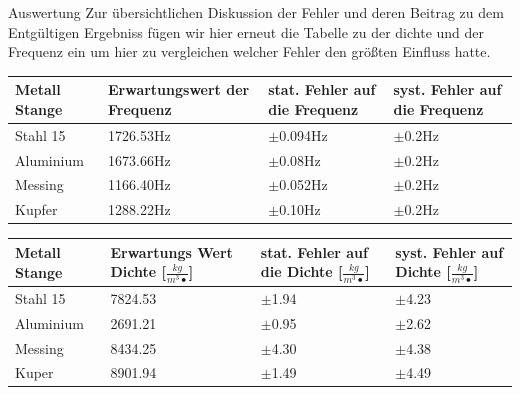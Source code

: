 \documentclass[twoside]{protokoll}
\begin{document}
\begin{aufgabe}{Auswertung}
Zur übersichtlichen Diskussion der Fehler und deren Beitrag zu dem Entgültigen Ergebniss fügen wir hier erneut die Tabelle zu der dichte und der Frequenz ein um hier zu vergleichen welcher Fehler den größten Einfluss hatte. 

 \begin{table}[H]
        \centering
        \begin{tabularx}{1\textwidth}{X X X X} %
            \toprule
            \textbf{Metall Stange} & \textbf{Erwartungswert der Frequenz} & \textbf{stat. Fehler auf die Frequenz} & \textbf{syst. Fehler auf die Frequenz} \\
            \midrule
            Stahl 15 & 1726.53Hz & $\pm$0.094Hz & $\pm$0.2Hz\\
            Aluminium & 1673.66Hz & $\pm$0.08Hz & $\pm$0.2Hz \\
            Messing & 1166.40Hz & $\pm$0.052Hz & $\pm$0.2Hz \\
            Kupfer & 1288.22Hz & $\pm$0.10Hz & $\pm$0.2Hz \\

            \bottomrule
        \end{tabularx}
        \label{tab:mytable}
    \end{table}
    
 \begin{table}[H]
        \centering
        \begin{tabularx}{1\textwidth}{X X X X} %
            \toprule
            \textbf{Metall Stange} & \textbf{Erwartungs Wert Dichte [$\frac{kg}{m^3•}$]} & \textbf{stat. Fehler auf die Dichte [$\frac{kg}{m^3•}$]} & \textbf{syst. Fehler auf Dichte [$\frac{kg}{m^3•}$]}\\
            \midrule
            Stahl 15 & 7824.53 & $\pm$1.94 & $\pm$4.23 \\
            Aluminium & 2691.21 & $\pm$0.95 & $\pm$2.62 \\
            Messing & 8434.25 & $\pm$4.30 & $\pm$4.38 \\
            Kuper & 8901.94 & $\pm$1.49 & $\pm$4.49\\
            \bottomrule
        \end{tabularx}
        \label{tab:mytable}
    \end{table}

\end{aufgabe}

\end{document}
